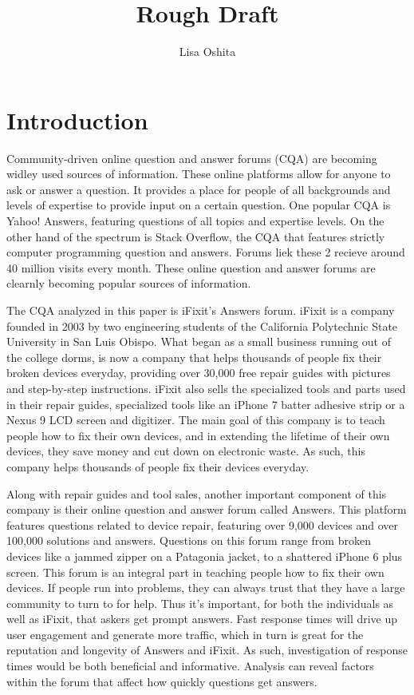 \documentclass[12pt]{article}
\title{Rough Draft}
\author{Lisa Oshita}
\date{}
\begin{document}
\maketitle

\section{Introduction}

    Community-driven online question and answer forums (CQA) are becoming widley used sources of information. These online platforms allow for anyone to ask or answer a question. It provides a place for people of all backgrounds and levels of expertise to provide input on a certain question. One popular CQA is Yahoo! Answers, featuring questions of all topics and expertise levels. On the other hand of the spectrum is Stack Overflow, the CQA that features strictly computer programming question and answers. Forums liek these 2 recieve around 40 million visits every month. These online question and answer forums are clearnly becoming popular sources of information. 
    
    The CQA analyzed in this paper is iFixit's Answers forum. iFixit is a company founded in 2003 by two engineering students of the California Polytechnic State University in San Luis Obispo. What began as a small business running out of the college dorms, is now a company that helps thousands of people fix their broken devices everyday, providing over 30,000 free repair guides with pictures and step-by-step instructions. iFixit also sells the specialized tools and parts used in their repair guides, specialized tools like an iPhone 7 batter adhesive strip or a Nexus 9 LCD screen and digitizer. The main goal of this company is to teach people how to fix their own devices, and in extending the lifetime of their own devices, they save money and cut down on electronic waste. As such, this company helps thousands of people fix their devices everyday. 
    
    Along with repair guides and tool sales, another important component of this company is their online question and answer forum called Answers. This platform features questions related to device repair, featuring over 9,000 devices and over 100,000 solutions and answers. Questions on this forum range from broken devices like a jammed zipper on a Patagonia jacket, to a shattered iPhone 6 plus screen. This forum is an integral part in teaching people how to fix their own devices. If people run into problems, they can always trust that they have a large community to turn to for help. Thus it's important, for both the individuals as well as iFixit, that askers get prompt answers. Fast response times will drive up user engagement and generate more traffic, which in turn is great for the reputation and longevity of Answers and iFixit. As such, investigation of response times would be both beneficial and informative. Analysis can reveal factors within the forum that affect how quickly questions get answers. 
\end{document}
